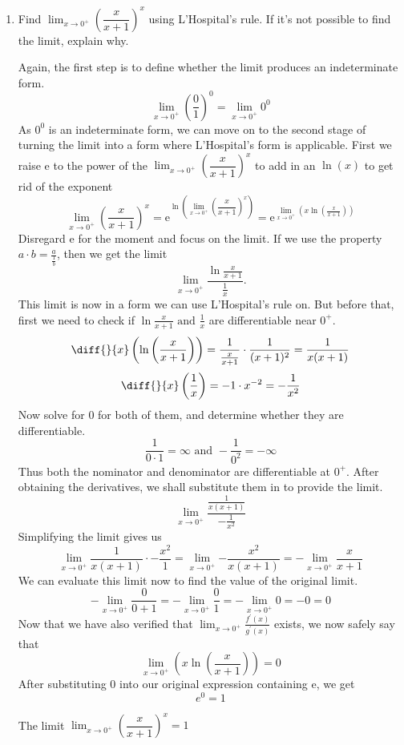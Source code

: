 \documentclass{article}
\begin{document}
\begin{enumerate}[label=\textbf{(12.\arabic*)}]
	
\item Find $\lim_{x\to0^+} {\left(\dfrac{x}{x+1}\right)}^x$ using L'Hospital's rule. If it's not possible to find the limit, explain why.

\par

Again, the first step is to define whether the limit produces an indeterminate form.
\[\lim_{x \to 0^+} {{\left(\frac{0}{1}\right)}^0}=\lim_{x \to 0^+} {0^0}\]
As $0^0$ is an indeterminate form, we can move on to the second stage of turning the limit into a form where L'Hospital's form is applicable. %
First we raise e to the power of the $\lim_{x\to0^+} {\left(\dfrac{x}{x+1}\right)}^x$ to add in an $\ln{(x)}$ to get rid of the exponent
\[\lim_{x\to0^+} {\left(\dfrac{x}{x+1}\right)}^x=\text{e}^{\ln\left(\lim_{x\to0^+} {\left(\dfrac{x}{x+1}\right)}^x\right)}=\text{e}^{\lim_{x\to0^+} {\left(x\ln{\left(\frac{x}{x+1}\right)}\right)}}\]
Disregard e for the moment and focus on the limit. If we use the property $a\cdot b=\frac{a}{\frac{1}{b}}$, then we get the limit
\[\lim_{x \to 0^+} {\frac{\ln{\frac{x}{x+1}}}{\frac{1}{x}}}\text{.}\]
This limit is now in a form we can use L'Hospital's rule on. %
 But before that, first we need to check if $\ln{\frac{x}{x+1}} \text{ and } \frac{1}{x}$ are differentiable near $0^+$.
\[\diff{}{x}\left(\ln{\left(\frac{x}{x+1}\right)}\right)=\frac{1}{\frac{x}{x+1}}\cdot\frac{1}{(x+1)^2}=\frac{1}{x(x+1)}\]
\[\diff{}{x}\left(\frac{1}{x}\right)=-1\cdot x^{-2}=-\frac{1}{x^2}\]
Now solve for 0 for both of them, and determine whether they are differentiable.
\[\frac{1}{0\cdot1}=\infty \text{ and } -\frac{1}{0^2}=-\infty\]
Thus both the nominator and denominator are differentiable at $0^+$.  %
After obtaining the derivatives, we shall substitute them in to provide the limit.
\[\lim_{x \to 0^+} {\frac{\frac{1}{x(x+1)}}{-\frac{1}{x^2}}}\]
Simplifying the limit gives us
\[\lim_{x \to 0^+} {\frac{1}{x(x+1)}\cdot-\frac{x^2}{1}}=\lim_{x \to 0^+} {-\frac{x^2}{x(x+1)}}=-\lim_{x \to 0^+} {\frac{x}{x+1}}\] %
We can evaluate this limit now to find the value of the original limit.
\[-\lim_{x \to 0^+} {\frac{0}{0+1}}=-\lim_{x \to 0^+} {\frac{0}{1}}=-\lim_{x \to 0^+} {0}=-0=0\] %
Now that we have also verified that $\lim_{x\to0^+} {\frac{f^\prime(x)}{g^\prime(x)}}$ exists, we now safely say that
\[\lim_{x \to 0^+} {\left(x\ln{\left(\frac{x}{x+1}\right)}\right)}=0\] %
After substituting 0 into our original expression containing e, we get
\[e^0=1\] 
\begin{tcolorbox}[colback=white]
The limit $\lim_{x\to0^+} {\left(\dfrac{x}{x+1}\right)}^x=1$ %
\centering
\end{tcolorbox}


\end{enumerate}
\end{document}
